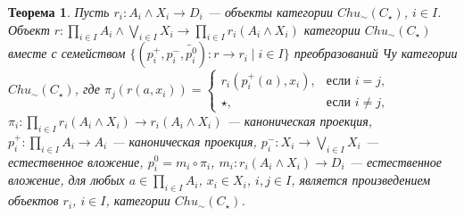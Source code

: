 \documentclass[a4paper,12pt]{article}
\newtheorem{theorem}{Теорема}
\begin{document}
\begin{theorem}\label{product-c}
    Пусть $r_i: A_i \wedge X_i \to D_i$ --- объекты категории $Chu_\sim(C_\star)$, $i \in I$. Объект $r: \prod_{i \in I} A_i \wedge \bigvee_{i \in I} X_i \to \prod_{i \in I} r_i(A_i \wedge X_i)$ категории $Chu_\sim(C_\star)$ вместе с семейством $\{(p^+_i,p^-_i,\widetilde{p^0_i}): r \to r_i \mid i \in I\}$ преобразований Чу категории $Chu_\sim(C_\star)$, где $\pi_j(r(a,x_i)) = 
    \begin{cases}
        r_i(p^+_i(a),x_i),& \text{если } i = j,\\
        \star,& \text{если } i \ne j,
    \end{cases}$
    $\pi_i: \prod_{i \in I} r_i(A_i \wedge X_i) \to r_i(A_i \wedge X_i)$ --- каноническая проекция, $p^+_i: \prod_{i \in I} A_i \to A_i$ --- каноническая проекция, $p^-_i: X_i \to \bigvee_{i \in I} X_i$ --- естественное вложение, $p^0_i = m_i \circ \pi_i$, $m_i: r_i(A_i \wedge X_i) \to D_i$ --- естественное вложение, для любых $a \in \prod_{i \in I} A_i$, $x_i \in X_i$, $i,j \in I$, является произведением объектов $r_i$, $i \in I$, категории $Chu_\sim(C_\star)$.
\end{theorem}
\end{document}
